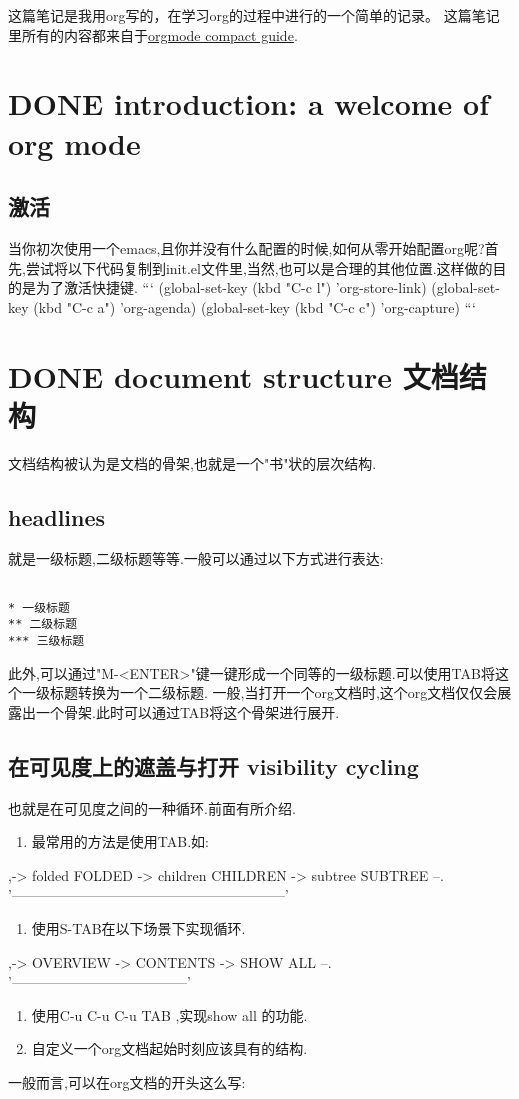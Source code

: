 \documentclass[10pt,a4paper]{article}
\title{}
\date{\today}
\title{}
\begin{document}
\tableofcontents

 这篇笔记是我用org写的，在学习org的过程中进行的一个简单的记录。
这篇笔记里所有的内容都来自于\href{https://orgmode.org/guide/}{orgmode compact guide}.
\section{{\bfseries\sffamily DONE} introduction: a welcome of org mode}
\label{sec:orgf32fdbd}
\subsection{激活}
\label{sec:org3ee883d}
当你初次使用一个emacs,且你并没有什么配置的时候,如何从零开始配置org呢?首先,尝试将以下代码复制到init.el文件里,当然,也可以是合理的其他位置.这样做的目的是为了激活快捷键.
```
(global-set-key (kbd "C-c l") 'org-store-link)
(global-set-key (kbd "C-c a") 'org-agenda)
(global-set-key (kbd "C-c c") 'org-capture)
```
\section{{\bfseries\sffamily DONE} document structure 文档结构}
\label{sec:org89271e5}
文档结构被认为是文档的骨架,也就是一个"书"状的层次结构.
\subsection{headlines}
\label{sec:orge7670f7}
就是一级标题,二级标题等等.一般可以通过以下方式进行表达:


\begin{verbatim}

* 一级标题
** 二级标题
*** 三级标题

\end{verbatim}


此外,可以通过"M-<ENTER>"键一键形成一个同等的一级标题.可以使用TAB将这个一级标题转换为一个二级标题.
一般,当打开一个org文档时,这个org文档仅仅会展露出一个骨架.此时可以通过TAB将这个骨架进行展开.
\subsection{在可见度上的遮盖与打开 visibility cycling}
\label{sec:orgee25423}
也就是在可见度之间的一种循环.前面有所介绍.
\begin{enumerate}
\item 最常用的方法是使用TAB.如:
\end{enumerate}
,-> folded FOLDED -> children CHILDREN -> subtree SUBTREE --.
'-----------------------------------------------------------'
\begin{enumerate}
\item 使用S-TAB在以下场景下实现循环.
\end{enumerate}
,-> OVERVIEW -> CONTENTS -> SHOW ALL --.
'--------------------------------------'
\begin{enumerate}
\item 使用C-u C-u C-u TAB ,实现show all 的功能.
\item 自定义一个org文档起始时刻应该具有的结构.
\end{enumerate}
一般而言,可以在org文档的开头这么写:
\end{document}
